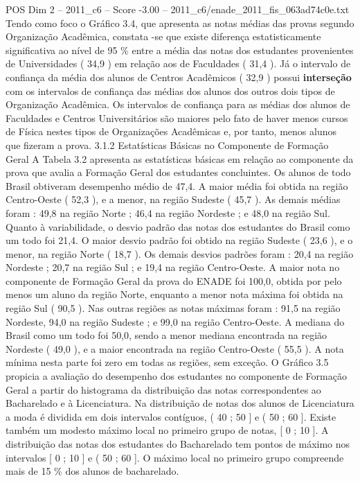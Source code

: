 \begin{textsample}{POS Dim 2 – 2011\_c6 – Score -3.00 – 2011\_c6/enade\_2011\_fis\_063ad74c0e.txt}
Tendo como foco o Gráfico 3.4, que apresenta as notas médias das provas segundo Organização Acadêmica, constata -se que existe diferença estatisticamente significativa ao nível de 95 \% entre a média das notas dos estudantes provenientes de Universidades ( 34,9 ) em relação aos de Faculdades ( 31,4 ).
Já o intervalo de confiança da média dos alunos de Centros Acadêmicos ( 32,9 ) possui \textbf{interseção} com os intervalos de confiança das médias dos alunos dos outros dois tipos de Organização Acadêmica.
Os intervalos de confiança para as médias dos alunos de Faculdades e Centros Universitários são maiores pelo fato de haver menos cursos de Física nestes tipos de Organizações Acadêmicas e, por tanto, menos alunos que fizeram a prova. 3.1.2 Estatísticas Básicas no Componente de Formação Geral A Tabela 3.2 apresenta as estatísticas básicas em relação ao componente da prova que avalia a Formação Geral dos estudantes concluintes.
Os alunos de todo Brasil obtiveram desempenho médio de 47,4.
A maior média foi obtida na região Centro-Oeste ( 52,3 ), e a menor, na região Sudeste ( 45,7 ).
As demais médias foram : 49,8 na região Norte ; 46,4 na região Nordeste ; e 48,0 na região Sul.
Quanto à variabilidade, o desvio padrão das notas dos estudantes do Brasil como um todo foi 21,4.
O maior desvio padrão foi obtido na região Sudeste ( 23,6 ), e o menor, na região Norte ( 18,7 ).
Os demais desvios padrões foram : 20,4 na região Nordeste ; 20,7 na região Sul ; e 19,4 na região Centro-Oeste.
A maior nota no componente de Formação Geral da prova do ENADE foi 100,0, obtida por pelo menos um aluno da região Norte, enquanto a menor nota máxima foi obtida na região Sul ( 90,5 ).
Nas outras regiões as notas máximas foram : 91,5 na região Nordeste, 94,0 na região Sudeste ; e 99,0 na região Centro-Oeste.
A mediana do Brasil como um todo foi 50,0, sendo a menor mediana encontrada na região Nordeste ( 49,0 ), e a maior encontrada na região Centro-Oeste ( 55,5 ).
A nota mínima nesta parte foi zero em todas as regiões, sem exceção.
O Gráfico 3.5 propicia a avaliação do desempenho dos estudantes no componente de Formação Geral a partir do histograma da distribuição das notas correspondentes ao Bacharelado e à Licenciatura.
Na distribuição de notas dos alunos de Licenciatura a moda é dividida em dois intervalos contíguos, ( 40 ; 50 ] e ( 50 ; 60 ].
Existe também um modesto máximo local no primeiro grupo de notas, [ 0 ; 10 ].
A distribuição das notas dos estudantes do Bacharelado tem pontos de máximo nos intervalos [ 0 ; 10 ] e ( 50 ; 60 ].
O máximo local no primeiro grupo compreende mais de 15 \% dos alunos de bacharelado.

\end{textsample}
